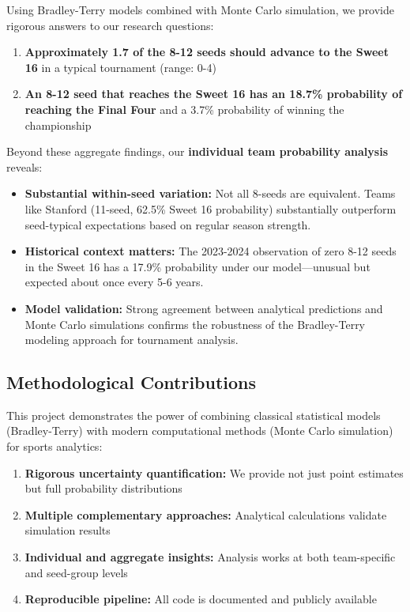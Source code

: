 \documentclass[
]{article}
\providecommand{\tightlist}{%
  \setlength{\itemsep}{0pt}\setlength{\parskip}{0pt}}
\begin{document}
Using Bradley-Terry models combined with Monte Carlo simulation, we
provide rigorous answers to our research questions:

\begin{enumerate}
\def\labelenumi{\arabic{enumi}.}
\tightlist
\item
  \textbf{Approximately 1.7 of the 8-12 seeds should advance to the
  Sweet 16} in a typical tournament (range: 0-4)
\item
  \textbf{An 8-12 seed that reaches the Sweet 16 has an 18.7\%
  probability of reaching the Final Four} and a 3.7\% probability of
  winning the championship
\end{enumerate}

Beyond these aggregate findings, our \textbf{individual team probability
analysis} reveals:

\begin{itemize}
\item
  \textbf{Substantial within-seed variation:} Not all 8-seeds are
  equivalent. Teams like Stanford (11-seed, 62.5\% Sweet 16 probability)
  substantially outperform seed-typical expectations based on regular
  season strength.
\item
  \textbf{Historical context matters:} The 2023-2024 observation of zero
  8-12 seeds in the Sweet 16 has a 17.9\% probability under our
  model---unusual but expected about once every 5-6 years.
\item
  \textbf{Model validation:} Strong agreement between analytical
  predictions and Monte Carlo simulations confirms the robustness of the
  Bradley-Terry modeling approach for tournament analysis.
\end{itemize}

\subsection{Methodological
Contributions}\label{methodological-contributions}

This project demonstrates the power of combining classical statistical
models (Bradley-Terry) with modern computational methods (Monte Carlo
simulation) for sports analytics:

\begin{enumerate}
\def\labelenumi{\arabic{enumi}.}
\tightlist
\item
  \textbf{Rigorous uncertainty quantification:} We provide not just
  point estimates but full probability distributions
\item
  \textbf{Multiple complementary approaches:} Analytical calculations
  validate simulation results
\item
  \textbf{Individual and aggregate insights:} Analysis works at both
  team-specific and seed-group levels
\item
  \textbf{Reproducible pipeline:} All code is documented and publicly
  available
\end{enumerate}
\end{document}
